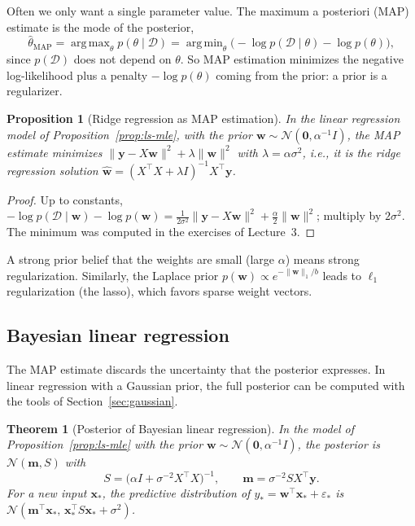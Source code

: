 \documentclass[11pt]{article}
\newcommand{\norm}[1]{\lVert #1 \rVert}
\theoremstyle{definition}
\theoremstyle{plain}
\newtheorem{theorem}[definition]{Theorem}
\newtheorem{proposition}[definition]{Proposition}
\theoremstyle{remark}
\DeclareMathOperator*{\argmin}{arg\,min}
\DeclareMathOperator*{\argmax}{arg\,max}
\begin{document}
Often we only want a single parameter value. The maximum a posteriori (MAP) estimate is the mode of the posterior,
\[\hat\theta_{\text{MAP}} = \argmax_\theta p(\theta \mid \mathcal{D}) = \argmin_\theta \big(-\log p(\mathcal{D} \mid \theta) - \log p(\theta)\big),\]
since $p(\mathcal{D})$ does not depend on $\theta$. So MAP estimation minimizes the negative log-likelihood plus a penalty $-\log p(\theta)$ coming from the prior: a prior is a regularizer.

\begin{proposition}[Ridge regression as MAP estimation]\label{prop:ridge-map}
    In the linear regression model of Proposition~\ref{prop:ls-mle}, with the prior $\mathbf{w} \sim \mathcal{N}(\mathbf{0}, \alpha^{-1}I)$, the MAP estimate minimizes $\norm{\mathbf{y} - X\mathbf{w}}^2 + \lambda\norm{\mathbf{w}}^2$ with $\lambda = \alpha\sigma^2$, i.e., it is the ridge regression solution $\hat{\mathbf{w}} = (X^\top X + \lambda I)^{-1}X^\top\mathbf{y}$.
\end{proposition}

\begin{proof}
    Up to constants, $-\log p(\mathcal{D} \mid \mathbf{w}) - \log p(\mathbf{w}) = \frac{1}{2\sigma^2}\norm{\mathbf{y} - X\mathbf{w}}^2 + \frac{\alpha}{2}\norm{\mathbf{w}}^2$; multiply by $2\sigma^2$. The minimum was computed in the exercises of Lecture~3.
\end{proof}

A strong prior belief that the weights are small (large $\alpha$) means strong regularization. Similarly, the Laplace prior $p(\mathbf{w}) \propto e^{-\norm{\mathbf{w}}_1/b}$ leads to $\ell_1$ regularization (the lasso), which favors sparse weight vectors.

\subsection{Bayesian linear regression}

The MAP estimate discards the uncertainty that the posterior expresses. In linear regression with a Gaussian prior, the full posterior can be computed with the tools of Section~\ref{sec:gaussian}.

\begin{theorem}[Posterior of Bayesian linear regression]\label{thm:blr}
    In the model of Proposition~\ref{prop:ls-mle} with the prior $\mathbf{w} \sim \mathcal{N}(\mathbf{0}, \alpha^{-1}I)$, the posterior is $\mathcal{N}(\mathbf{m}, S)$ with
    \[S = \big(\alpha I + \sigma^{-2}X^\top X\big)^{-1}, \qquad \mathbf{m} = \sigma^{-2}SX^\top\mathbf{y}.\]
    For a new input $\mathbf{x}_*$, the predictive distribution of $y_* = \mathbf{w}^\top\mathbf{x}_* + \varepsilon_*$ is $\mathcal{N}(\mathbf{m}^\top\mathbf{x}_*, \, \mathbf{x}_*^\top S\mathbf{x}_* + \sigma^2)$.
\end{theorem}
\end{document}

